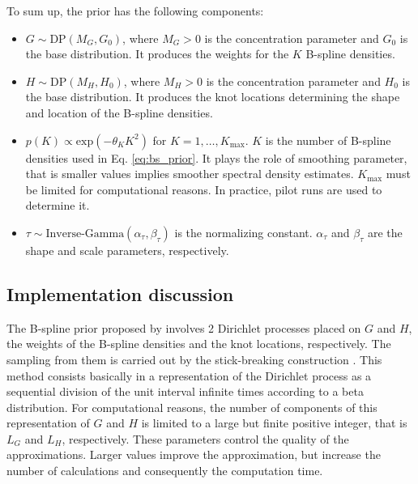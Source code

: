 \documentclass[aps,reprint,amsmath,amssymb,showpacs,showkeys]{revtex4-1}%
\begin{document}
To sum up, the prior has the following components:
\begin{itemize}
	\item $G \sim \text{DP}(M_G, G_0)$, where $M_G>0$ is the concentration parameter and $G_0$ is the base distribution.  It produces the weights for the $K$ B-spline densities.  
	\item $H \sim \text{DP}(M_H, H_0)$, where $M_H>0$ is the concentration parameter and $H_0$ is the base distribution.  It produces the knot locations determining the shape and location of the B-spline densities.
	\item $p(K) \propto \text{exp}(-\theta_K K^2)$ for $K=1,\dots,K_{\text{max}}$.  $K$ is the number of B-spline densities used in Eq. \eqref{eq:bs_prior}.  It plays the role of smoothing parameter, that is smaller values implies smoother spectral density estimates.  $K_{\text{max}}$ must be limited  for computational reasons.  In practice, pilot runs are used to determine it.
	\item $\tau \sim \text{Inverse-Gamma}(\alpha_{\tau},\beta_{\tau})$ is the normalizing constant.  $\alpha_{\tau}$ and $\beta_{\tau}$ are the shape and scale parameters, respectively.
\end{itemize}

\subsection*{Implementation discussion}

The B-spline prior proposed by \cite{Edwards2018} involves 2 Dirichlet processes placed on $G$ and $H$, the weights of the B-spline densities and the knot locations, respectively.  The sampling from them is carried out by the stick-breaking construction \citep{Sethuraman:1994}.  This method consists basically in a representation of the Dirichlet process as a sequential division of the unit interval infinite times according to a beta distribution.  For computational reasons, the number of components of this representation of $G$ and $H$ is limited to a large but finite positive integer, that is $L_G$ and $L_H$, respectively.  These parameters control the quality of the approximations.  Larger values improve the approximation, but increase the number of calculations and consequently the computation time.
\end{document}
